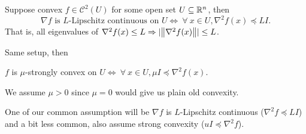 \documentclass[class=article,crop=false]{standalone}
\begin{document}
\begin{thm}
	Suppose convex $ f \in \mathcal{ C}^2(U)$ for some open set $ U \subseteq \mathbb{R}^{n}$, then
	\[
		\nabla f \text{ is $L$-Lipschitz continuous on } U \iff \ \forall \ x \in U, \nabla ^2 f(x) \preceq L I 
	.\] 
	That is, all eigenvalues of $ \nabla ^2f(x) \leq L \Rightarrow |{\left\lVert{ \nabla ^2 f(x)}\right\rVert} | \leq L$.
\end{thm}
\begin{thm}
Same setup, then 

$ f$ is  $ \mu$-strongly convex on $ U \iff \ \forall \ x \in U, \mu I \preceq \nabla ^2 f(x)$.
\end{thm}
\begin{note}
We assume $ \mu>0$ since $ \mu=0$ would give us plain old convexity.
\end{note}
\begin{remark}
	One of our common assumption will be $ \nabla f$ is $L$-Lipschitz continuous ($ \nabla ^2 f \preceq LI$) and a bit less common, also assume strong convexity ($ uI \preceq \nabla ^2 f$).
\end{remark}
\end{document}
